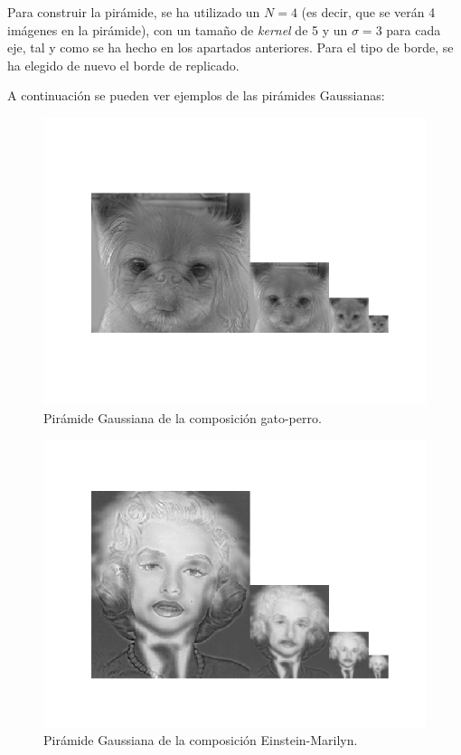 \documentclass[11pt,a4paper]{article}
\begin{document}
Para construir la pirámide, se ha utilizado un $N=4$ (es decir, que se verán 4 imágenes en la pirámide), con un tamaño de
\textit{kernel} de 5 y un $\sigma=3$ para cada eje, tal y como se ha hecho en los apartados anteriores.
Para el tipo de borde, se ha elegido de nuevo el borde de replicado.

A continuación se pueden ver ejemplos de las pirámides Gaussianas:

\begin{figure}[H]
\centering
\includegraphics[scale=0.7]{img/hyb-pyr1.png}
\caption{Pirámide Gaussiana de la composición gato-perro.}
\label{fig:hyb-pyr1}
\end{figure}

\begin{figure}[H]
\centering
\includegraphics[scale=0.7]{img/hyb-pyr2.png}
\caption{Pirámide Gaussiana de la composición Einstein-Marilyn.}
\label{fig:hyb-pyr2}
\end{figure}
\end{document}
